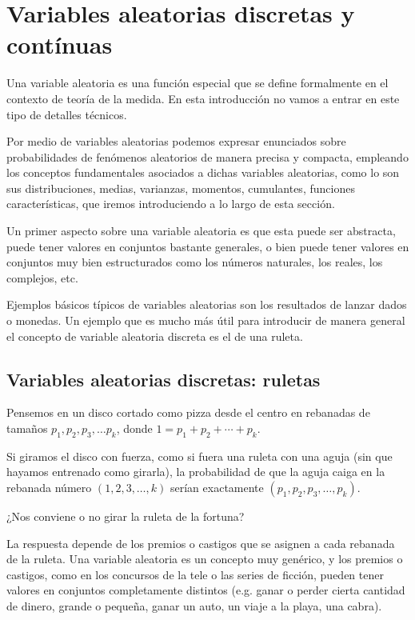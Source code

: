 \section{Variables aleatorias discretas y contínuas}

Una variable aleatoria es una función especial que se define formalmente en el contexto de teoría de la medida. En esta introducción no vamos a entrar en este tipo de detalles técnicos.

Por medio de variables aleatorias podemos expresar enunciados sobre probabilidades de fenómenos aleatorios de manera precisa y compacta, empleando los conceptos fundamentales asociados a dichas variables aleatorias, como lo son sus distribuciones, medias, varianzas, momentos, cumulantes, funciones características, que iremos introduciendo a lo largo de esta sección.

Un primer aspecto sobre una variable aleatoria es que esta puede ser abstracta, puede tener valores en conjuntos bastante generales, o bien puede tener valores en conjuntos muy bien estructurados como los números naturales, los reales, los complejos, etc.

Ejemplos básicos típicos de variables aleatorias son los resultados de lanzar dados o monedas. Un ejemplo que es mucho más útil para introducir de manera general el concepto de variable aleatoria discreta es el de una ruleta. 

\subsection{Variables aleatorias discretas: ruletas}

Pensemos en un disco cortado como pizza desde el centro en rebanadas de tamaños $p_1, p_2, p_3, \dots p_k$, donde $1=p_1+p_2+\cdots +p_k$. 

Si giramos el disco con fuerza, como si fuera una ruleta con una aguja (sin que hayamos entrenado como girarla), la probabilidad de que la aguja caiga en la rebanada número $(1, 2, 3, \dots, k)$ serían exactamente $(p_1, p_2, p_3, \dots, p_k)$.

¿Nos conviene o no girar la ruleta de la fortuna?

La respuesta depende de los premios o castigos que se asignen a cada rebanada de la ruleta. Una variable aleatoria es un concepto muy genérico, y los premios o castigos, como en los concursos de la tele o las series de ficción, pueden tener valores en conjuntos completamente distintos (e.g. ganar o perder cierta cantidad de dinero, grande o pequeña, ganar un auto, un viaje a la playa, una cabra). 

